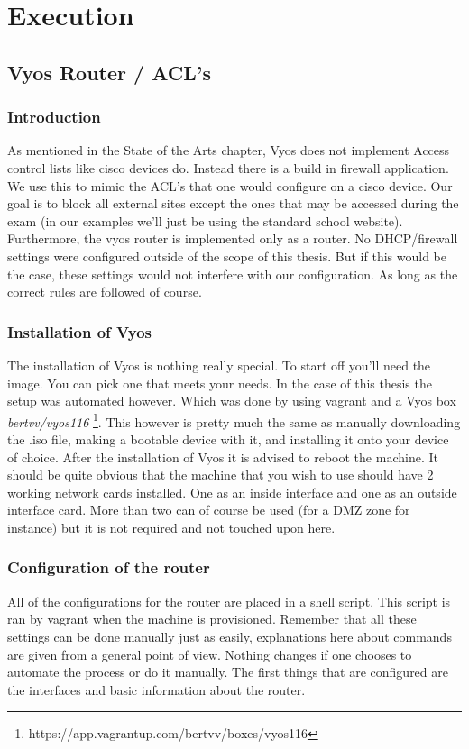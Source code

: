 
\chapter{Execution}
\label{ch:execution}

\section{Vyos Router / ACL's}
\subsection{Introduction}
As mentioned in the State of the Arts chapter, Vyos does not implement Access control lists like cisco devices do. Instead there is a build in firewall application. We use this to mimic the ACL's that one would configure on a cisco device. Our goal is to block all external sites except the ones that may be accessed during the exam (in our examples we'll just be using the standard school website). Furthermore, the vyos router is implemented only as a router. No DHCP/firewall settings were configured outside of the scope of this thesis. But if this would be the case, these settings would not interfere with our configuration. As long as the correct rules are followed of course. 
\subsection{Installation of Vyos}
The installation of Vyos is nothing really special. To start off you'll need the image. You can pick one that meets your needs. In the case of this thesis the setup was automated however. Which was done by using vagrant and a Vyos box \textit{bertvv/vyos116} \footnote{ https://app.vagrantup.com/bertvv/boxes/vyos116}. This however is pretty much the same as manually downloading the .iso file, making a bootable device with it, and installing it onto your device of choice. After the installation of Vyos it is advised  to reboot the machine. It should be quite obvious that the machine that you wish to use should have 2 working network cards installed. One as an inside interface and one as an outside interface card. More than two can of course be used (for a DMZ zone for instance) but it is not required and not touched upon here.
\subsection{Configuration of the router}
All of the configurations for the router are placed in a shell script. This script is ran by vagrant when the machine is provisioned. Remember that all these settings can be done manually just as easily, explanations here about commands are given from a general point of view. Nothing changes if one chooses to automate the process or do it manually. The first things that are configured are the interfaces and basic information about the router.\\

